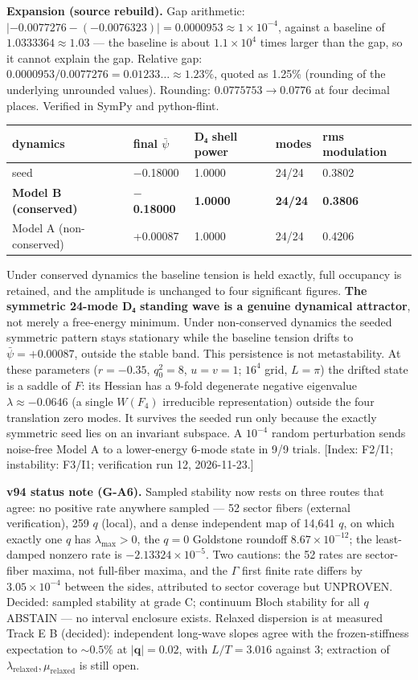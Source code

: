 \documentclass[a4paper,11pt]{article}
\newcommand{\expansion}[1]{\par\smallskip\noindent\textbf{Expansion (source rebuild).} #1\par\smallskip}
\begin{document}
\expansion{Gap arithmetic: $|-0.0077276 - (-0.0076323)| = 0.0000953 \approx 1\times10^{-4}$, against a baseline of $1.0333364 \approx 1.03$ --- the baseline is about $1.1\times10^4$ times larger than the gap, so it cannot explain the gap. Relative gap: $0.0000953/0.0077276 = 0.01233\ldots \approx 1.23\%$, quoted as 1.25\% (rounding of the underlying unrounded values). Rounding: $0.0775753 \to 0.0776$ at four decimal places. Verified in SymPy and python-flint.}
\begin{center}
\begin{tabular}{lllll}
\hline
dynamics & final $\bar\psi$ & D₄ shell power & modes & rms modulation \\
\hline
seed & $-$0.18000 & 1.0000 & 24/24 & 0.3802 \\
\textbf{Model B (conserved)} & \textbf{$-$0.18000} & \textbf{1.0000} & \textbf{24/24} & \textbf{0.3806} \\
Model A (non-conserved) & +0.00087 & 1.0000 & 24/24 & 0.4206 \\
\hline
\end{tabular}
\end{center}

Under conserved dynamics the baseline tension is held exactly, full occupancy is retained, and the amplitude is unchanged to four significant figures. \textbf{The symmetric 24-mode D₄ standing wave is a genuine dynamical attractor}, not merely a free-energy minimum. Under non-conserved dynamics the seeded symmetric pattern stays stationary while the baseline tension drifts to $\bar\psi=+0.00087$, outside the stable band. This persistence is not metastability. At these parameters ($r=-0.35$, $q_0^2=8$, $u=v=1$; $16^4$ grid, $L=\pi$) the drifted state is a saddle of $F$: its Hessian has a 9-fold degenerate negative eigenvalue $\lambda\approx-0.0646$ (a single $W(F_4)$ irreducible representation) outside the four translation zero modes. It survives the seeded run only because the exactly symmetric seed lies on an invariant subspace. A $10^{-4}$ random perturbation sends noise-free Model A to a lower-energy 6-mode state in 9/9 trials. [Index: F2/I1; instability: F3/I1; verification run 12, 2026-11-23.]

\textbf{v94 status note (G-A6).} Sampled stability now rests on three routes that agree: no positive rate anywhere sampled --- 52 sector fibers (external verification), 259 $q$ (local), and a dense independent map of 14,641 $q$, on which exactly one $q$ has $\lambda_{\max}>0$, the $q=0$ Goldstone roundoff $8.67\times10^{-12}$; the least-damped nonzero rate is $-2.13324\times10^{-5}$. Two cautions: the 52 rates are sector-fiber maxima, not full-fiber maxima, and the $\Gamma$ first finite rate differs by $3.05\times10^{-4}$ between the sides, attributed to sector coverage but UNPROVEN. Decided: sampled stability at grade C; continuum Bloch stability for all $q$ ABSTAIN --- no interval enclosure exists. Relaxed dispersion is at measured Track E B (decided): independent long-wave slopes agree with the frozen-stiffness expectation to $\sim0.5\%$ at $|\mathbf{q}|=0.02$, with $L/T=3.016$ against $3$; extraction of $\lambda_{\mathrm{relaxed}},\mu_{\mathrm{relaxed}}$ is still open.
\end{document}
